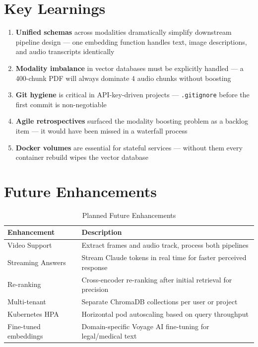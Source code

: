 \documentclass[12pt,a4paper]{report}
\begin{document}
\section{Key Learnings}

\begin{enumerate}[leftmargin=2cm]
    \item \textbf{Unified schemas} across modalities dramatically simplify downstream pipeline design --- one embedding function handles text, image descriptions, and audio transcripts identically
    \item \textbf{Modality imbalance} in vector databases must be explicitly handled --- a 400-chunk PDF will always dominate 4 audio chunks without boosting
    \item \textbf{Git hygiene} is critical in API-key-driven projects --- \texttt{.gitignore} before the first commit is non-negotiable
    \item \textbf{Agile retrospectives} surfaced the modality boosting problem as a backlog item --- it would have been missed in a waterfall process
    \item \textbf{Docker volumes} are essential for stateful services --- without them every container rebuild wipes the vector database
\end{enumerate}

\section{Future Enhancements}

\begin{table}[H]
\centering
\caption{Planned Future Enhancements}
\begin{tabular}{p{3.5cm}p{9cm}}
\toprule
\textbf{Enhancement} & \textbf{Description} \\
\midrule
Video Support & Extract frames and audio track, process both pipelines \\
Streaming Answers & Stream Claude tokens in real time for faster perceived response \\
Re-ranking & Cross-encoder re-ranking after initial retrieval for precision \\
Multi-tenant & Separate ChromaDB collections per user or project \\
Kubernetes HPA & Horizontal pod autoscaling based on query throughput \\
Fine-tuned embeddings & Domain-specific Voyage AI fine-tuning for legal/medical text \\
\bottomrule
\end{tabular}
\end{table}
\end{document}

